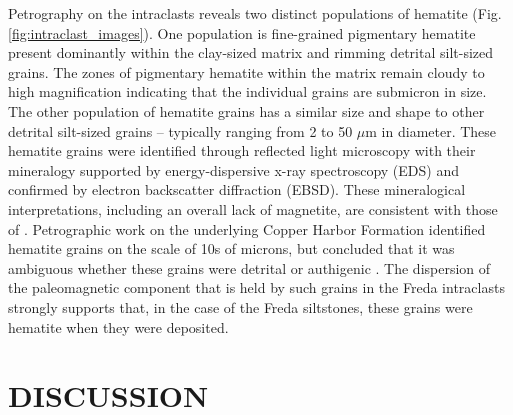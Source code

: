 \documentclass[11pt,letterpaper]{article}
\begin{document}
Petrography on the intraclasts reveals two distinct populations of hematite (Fig. \ref{fig:intraclast_images}). One population is fine-grained pigmentary hematite present dominantly within the clay-sized matrix and rimming detrital silt-sized grains. The zones of pigmentary hematite within the matrix remain cloudy to high magnification indicating that the individual grains are submicron in size. The other population of hematite grains has a similar size and shape to other detrital silt-sized grains  -- typically ranging from 2 to 50 $\mu$m in diameter. These hematite grains were identified through reflected light microscopy with their mineralogy supported by energy-dispersive x-ray spectroscopy (EDS) and confirmed by electron backscatter diffraction (EBSD). These mineralogical interpretations, including an overall lack of magnetite, are consistent with those of \cite{Vincenz1968b}. Petrographic work on the underlying Copper Harbor Formation identified hematite grains on the scale of 10s of microns, but concluded that it was ambiguous whether these grains were detrital or authigenic \citep{Elmore1982a}. The dispersion of the paleomagnetic component that is held by such grains in the Freda intraclasts strongly supports that, in the case of the Freda siltstones, these grains were hematite when they were deposited. 



\section*{DISCUSSION}
\end{document}
